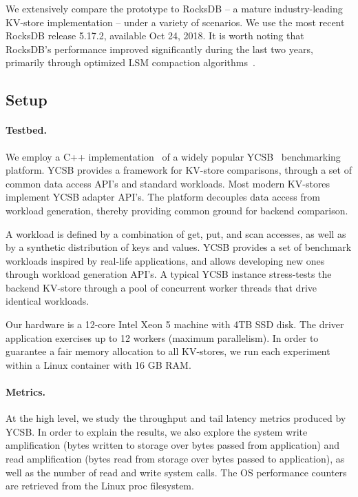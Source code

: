 We extensively compare the \sys\/ prototype to RocksDB -- a mature industry-leading KV-store implementation  -- under a variety of scenarios.  We use the most recent RocksDB release 5.17.2, available Oct 24, 2018.  
It is worth noting that RocksDB's performance improved significantly during the last two years, primarily through 
optimized LSM compaction algorithms~\cite{CallaghanCompaction}.   

\subsection{Setup}

\paragraph{Testbed.} We employ a C++ implementation~\cite{Cpp-YCSB} of a widely popular 
YCSB~\cite{YCSB} benchmarking platform. 
YCSB provides a framework for KV-store comparisons, through a set of common data access API's and standard workloads. 
Most modern KV-stores implement  YCSB adapter API's. The platform decouples data access from workload generation, 
thereby providing common ground for backend comparison. 

A workload is defined by a combination of get, put, and scan accesses, as well as by a synthetic distribution of keys and values. 
YCSB provides a set of benchmark workloads inspired by real-life applications, and allows developing new ones through workload 
generation API's. A typical YCSB instance stress-tests the backend KV-store through a pool of concurrent worker threads that drive identical
workloads. %

Our hardware is a 12-core Intel Xeon 5 machine with 4TB SSD disk. The driver application exercises up to 12 workers 
(maximum parallelism). In order to guarantee a fair memory allocation to all KV-stores, we run each experiment 
within a Linux container with 16 GB RAM. 

\paragraph{Metrics.} At the high level, we study the throughput and tail latency metrics produced by YCSB. 
In order to explain the results, we also explore the system write amplification (bytes written to storage over 
bytes passed from application) and read amplification (bytes read from storage over bytes passed to application), 
as well as the number of read and write system calls. The OS performance counters are retrieved from the Linux
proc filesystem. 

